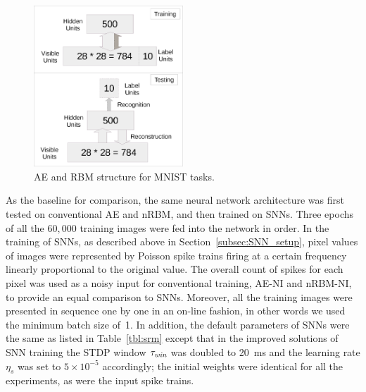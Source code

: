 \begin{figure}
	\centering
	\includegraphics[width=0.5\textwidth]{pics_sdlm/mnist.png}
	\caption{AE and RBM structure for MNIST tasks.}
	\label{fig:MNSIT}
\end{figure}

As the baseline for comparison, the same neural network architecture was first tested on conventional AE and nRBM, and then trained on SNNs.
Three epochs of all the $60,000$ training images were fed into the network in order.
In the training of SNNs, as described above in Section~\ref{subsec:SNN_setup}, pixel values of images were represented by Poisson spike trains firing at a certain frequency linearly proportional to the original value.
The overall count of spikes for each pixel was used as a noisy input for conventional training, AE-NI and nRBM-NI, to provide an equal comparison to SNNs.
Moreover, all the training images were presented in sequence one by one in an on-line fashion, in other words we used the minimum batch size of~1.
In addition, the default parameters of SNNs were the same as listed in Table~\ref{tbl:srm} except that in the improved solutions of SNN training the STDP window $\tau_\textit{\textrm{win}}$ was doubled to 20~ms and the learning rate $\eta_s$ was set to $5 \times 10^{-5}$ accordingly;
the initial weights were identical for all the experiments, as were the input spike trains.


